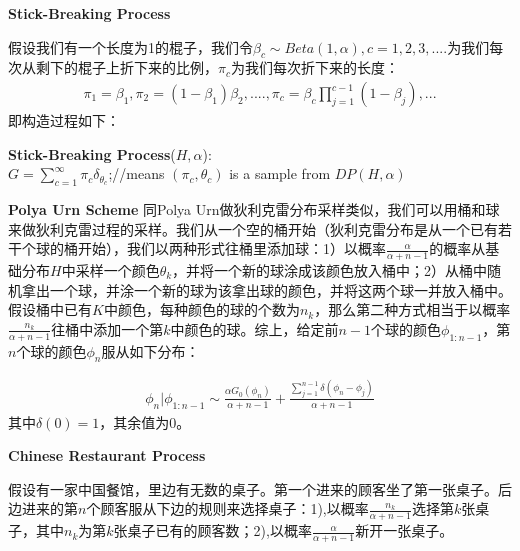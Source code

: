 \textbf{Stick-Breaking Process}

假设我们有一个长度为1的棍子，我们令$\beta_c \sim Beta(1, \alpha), c=1,2,3,....$为我们每次从剩下的棍子上折下来的比例，$\pi_c$为我们每次折下来的长度：
\begin{displaymath}
\begin{split}
\pi_1= \beta_1, \pi_2=(1-\beta_1)\beta_2, ...., \pi_c=\beta_c\prod_{j=1}^{c-1}(1-\beta_j),...
\end{split}
\end{displaymath}
即构造过程如下：

\begin{minipage}{0.8\textwidth}\centering
\begin{algorithm}[H]
\textbf{Stick-Breaking Process}($H, \alpha$):\\
$G=\sum_{c=1}^{\infty}\pi_c\delta_{\theta_c}$;//means $(\pi_c, \theta_c)$ is a sample from $DP(H,\alpha)$
\end{algorithm}
\end{minipage}


\textbf{Polya Urn Scheme}
同Polya Urn做狄利克雷分布采样类似，我们可以用桶和球来做狄利克雷过程的采样。我们从一个空的桶开始（狄利克雷分布是从一个已有若干个球的桶开始），我们以两种形式往桶里添加球：1）以概率$\frac{\alpha}{\alpha+n-1}$的概率从基础分布$H$中采样一个颜色$\theta_k$，并将一个新的球涂成该颜色放入桶中；2）从桶中随机拿出一个球，并涂一个新的球为该拿出球的颜色，并将这两个球一并放入桶中。假设桶中已有$K$中颜色，每种颜色的球的个数为$n_k$，那么第二种方式相当于以概率$\frac{n_k}{\alpha+n-1}$往桶中添加一个第$k$中颜色的球。综上，给定前$n-1$个球的颜色$\phi_{1:n-1}$，第$n$个球的颜色$\phi_n$服从如下分布：

\begin{displaymath}
\begin{split}
\phi_n | \phi_{1:n-1} \sim \frac{\alpha G_0(\phi_n)}{\alpha+n-1} + \frac{\sum_{j=1}^{n-1} \delta(\phi_n-\phi_j) }{\alpha+n-1}
\end{split}
\end{displaymath}
其中$\delta(0)=1$，其余值为0。

\textbf{Chinese Restaurant Process}

假设有一家中国餐馆，里边有无数的桌子。第一个进来的顾客坐了第一张桌子。后边进来的第$n$个顾客服从下边的规则来选择桌子：1),以概率$\frac{n_k}{\alpha  + n -1}$选择第$k$张桌子，其中$n_k$为第$k$张桌子已有的顾客数；2),以概率$\frac{\alpha  }{\alpha   + n -1}$新开一张桌子。

